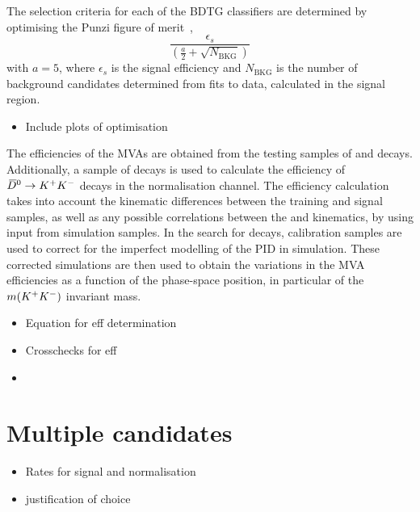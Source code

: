 The selection criteria for each of the BDTG classifiers are determined by optimising the Punzi figure of merit~\cite{Punzi:2003bu}, 
\begin{equation}
\frac{\epsilon_{s}}{(\frac{a}{2} + \sqrt{N_{\text{BKG}}})}
\end{equation}
with $a=5$, where $\epsilon_{s}$ is the signal efficiency and $N_{\text{BKG}}$ is the number of background candidates determined from fits to data, calculated in the signal region.

{\color{Red}
\begin{itemize}
\item Include plots of optimisation
\end{itemize}
}



The efficiencies of the MVAs are obtained from the testing samples of \decay{\Bs}{\jpsi\phiz} and \decay{\Bs}{\Dsp\pim} decays. Additionally, a sample of \decay{\Bp}{\Dz\pip} decays is used to calculate the efficiency of ${{\kern 0.2em\overline{\kern -0.2em D}{}}{}^0} \rightarrow {\ensuremath{{K}^+}} {\ensuremath{{K}^-}}$ decays in the normalisation channel. The efficiency calculation takes into account the kinematic differences between the training and signal samples, as well as any possible correlations between the \Dsp and \phiz kinematics, by using input from simulation samples. In the search for \decay{\Bp}{\Dsp\Kp\Km} decays, calibration samples are used to correct for the imperfect modelling of the PID in simulation. These corrected simulations are then used to obtain the variations in the MVA efficiencies as a function of the phase-space position, in particular of the $m({{K}^+}{{K}^-})$ invariant mass.

{\color{Red}
\begin{itemize}
\item Equation for eff determination
\item Crosschecks for eff
\item 
\end{itemize}
}

\section{Multiple candidates}



{\color{Red}
\begin{itemize}
\item Rates for signal and normalisation
\item justification of choice
\end{itemize}
}

